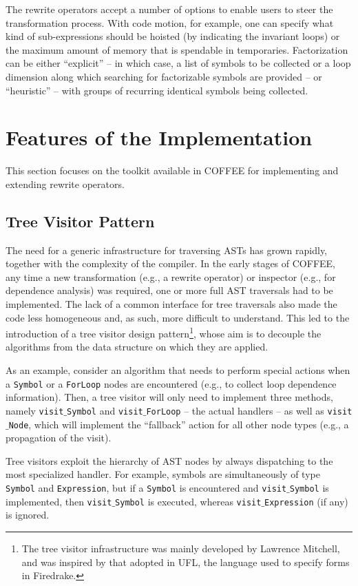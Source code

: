 The rewrite operators accept a number of options to enable users to steer the transformation process. With code motion, for example, one can specify what kind of sub-expressions should be hoisted (by indicating the invariant loops) or the maximum amount of memory that is spendable in temporaries. Factorization can be either ``explicit'' -- in which case, a list of symbols to be collected or a loop dimension along which searching for factorizable symbols are provided -- or ``heuristic'' -- with groups of recurring identical symbols being collected.

\section{Features of the Implementation}
This section focuses on the toolkit available in COFFEE for implementing and extending rewrite operators.

\subsection{Tree Visitor Pattern}
The need for a generic infrastructure for traversing ASTs has grown rapidly, together with the complexity of the compiler. In the early stages of COFFEE, any time a new transformation (e.g., a rewrite operator) or inspector (e.g., for dependence analysis) was required, one or more full AST traversals had to be implemented. The lack of a common interface for tree traversals also made the code less homogeneous and, as such, more difficult to understand. This led to the introduction of a tree visitor design pattern\footnote{The tree visitor infrastructure was mainly developed by Lawrence Mitchell, and was inspired by that adopted in UFL, the language used to specify forms in Firedrake.}, whose aim is to decouple the algorithms from the data structure on which they are applied. 

As an example, consider an algorithm that needs to perform special actions when a \texttt{Symbol} or a \texttt{ForLoop} nodes are encountered (e.g., to collect loop dependence information). Then, a tree visitor will only need to implement three methods, namely \texttt{visit$\_$Symbol} and \texttt{visit$\_$ForLoop} -- the actual handlers -- as well as \texttt{visit$\_$Node}, which will implement the ``fallback'' action for all other node types (e.g., a propagation of the visit).

Tree visitors exploit the hierarchy of AST nodes by always dispatching to the most specialized handler. For example, symbols are simultaneously of type \texttt{Symbol} and \texttt{Expression}, but if a \texttt{Symbol} is encountered and \texttt{visit$\_$Symbol} is implemented, then \texttt{visit$\_$Symbol} is executed, whereas \texttt{visit$\_$Expression} (if any) is ignored.

